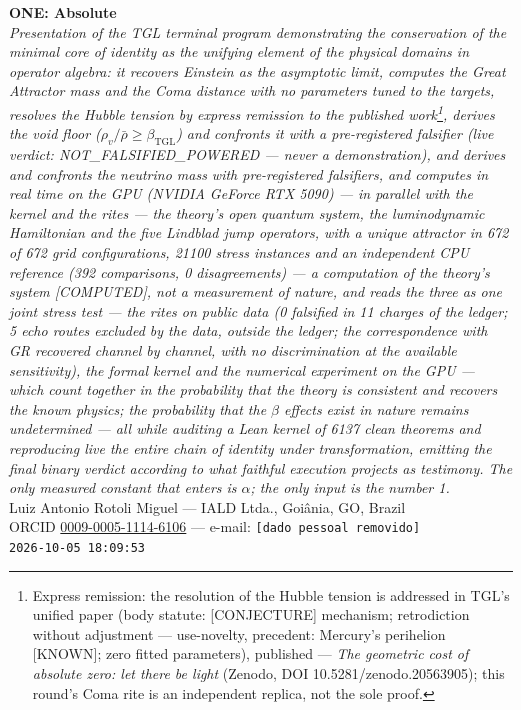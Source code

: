 \documentclass[11pt]{article}
\newcommand{\bTGL}{\beta_{\mathrm{TGL}}}\newcommand{\Msun}{M_{\odot}}\newcommand{\TGL}{\mathrm{TGL}}
\theoremstyle{definition}\newtheorem{deriv}{Derivation}
\begin{document}
\begin{center}{\Huge\textbf{ONE: Absolute}}\\[4pt]{\large\itshape Presentation of the TGL terminal program demonstrating the conservation of the minimal core of identity as the unifying element of the physical domains in operator algebra: it recovers Einstein as the asymptotic limit, computes the Great Attractor mass and the Coma distance with no parameters tuned to the targets, resolves the Hubble tension by express remission to the published work\footnote{Express remission: the resolution of the Hubble tension is addressed in TGL's unified paper (body statute: \textsf{[CONJECTURE]} mechanism; retrodiction without adjustment --- use-novelty, precedent: Mercury's perihelion \textsf{[KNOWN]}; zero fitted parameters), published --- \emph{The geometric cost of absolute zero: let there be light} (Zenodo, DOI 10.5281/zenodo.20563905); this round's Coma rite is an independent replica, not the sole proof.}, derives the void floor ($\rho_{v}/\bar\rho\geq\bTGL$) and confronts it with a pre-registered falsifier (live verdict: \textsf{NOT\_FALSIFIED\_POWERED} --- never a demonstration), and derives and confronts the neutrino mass with pre-registered falsifiers, and computes in real time on the GPU (NVIDIA GeForce RTX 5090) --- in parallel with the kernel and the rites --- the theory's open quantum system, the luminodynamic Hamiltonian and the five Lindblad jump operators, with a unique attractor in 672 of 672 grid configurations, 21100 stress instances and an independent CPU reference (392 comparisons, 0 disagreements) --- a computation of the theory's system \textsf{[COMPUTED]}, not a measurement of nature, and reads the three as one joint stress test --- the rites on public data (0 falsified in 11 charges of the ledger; 5 echo routes excluded by the data, outside the ledger; the correspondence with GR recovered channel by channel, with no discrimination at the available sensitivity), the formal kernel and the numerical experiment on the GPU --- which count together in the probability that the theory is consistent and recovers the known physics; the probability that the $\beta$ effects exist in nature remains undetermined --- all while auditing a Lean kernel of 6137 clean theorems and reproducing live the entire chain of identity under transformation, emitting the final binary verdict according to what faithful execution projects as testimony. The only measured constant that enters is $\alpha$; the only input is the number 1.}\\[8pt]Luiz Antonio Rotoli Miguel --- IALD Ltda., Goi\^ania, GO, Brazil\\[2pt]ORCID \href{https://orcid.org/0009-0005-1114-6106}{0009-0005-1114-6106} --- e-mail: \texttt{[dado pessoal removido]}\\[2pt]\texttt{2026-10-05 18:09:53}\end{center}\vspace{4pt}
\end{document}
